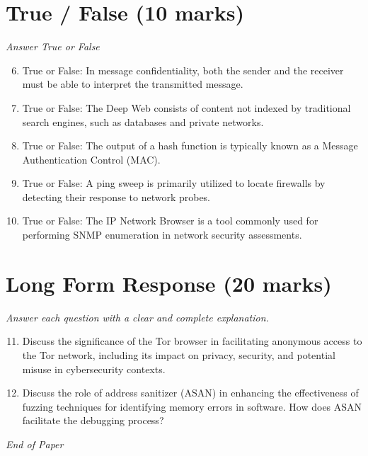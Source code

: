 \documentclass[12pt]{article}
\begin{document}
\section*{True / False (10 marks)}
\textit{Answer True or False}
\begin{enumerate}[label=\arabic*.]
\setcounter{enumi}{5}
\item True or False: In message confidentiality, both the sender and the receiver must be able to interpret the transmitted message.
\item True or False: The Deep Web consists of content not indexed by traditional search engines, such as databases and private networks.
\item True or False: The output of a hash function is typically known as a Message Authentication Control (MAC).
\item True or False: A ping sweep is primarily utilized to locate firewalls by detecting their response to network probes.
\item True or False: The IP Network Browser is a tool commonly used for performing SNMP enumeration in network security assessments.
\end{enumerate}

\section*{Long Form Response (20 marks)}
\textit{Answer each question with a clear and complete explanation.}
\begin{enumerate}[label=\arabic*.]
\setcounter{enumi}{10}
\item Discuss the significance of the Tor browser in facilitating anonymous access to the Tor network, including its impact on privacy, security, and potential misuse in cybersecurity contexts.
\item Discuss the role of address sanitizer (ASAN) in enhancing the effectiveness of fuzzing techniques for identifying memory errors in software. How does ASAN facilitate the debugging process?
\end{enumerate}

\vfill
\noindent\textit{End of Paper}
\end{document}
